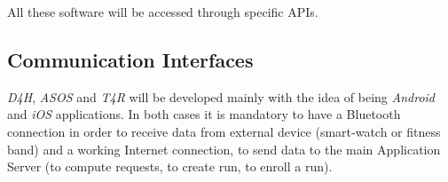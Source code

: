 All these software will be accessed through specific APIs.

\subsection{Communication Interfaces}
%
\emph{D4H}, \emph{ASOS} and \emph{T4R} will be developed mainly with the idea of being \emph{Android} and \emph{iOS} applications. In both cases it is mandatory to have a Bluetooth connection in order to receive data from external device (smart-watch or fitness band) and a working Internet connection,  to send data  to the main Application Server (to compute requests, to create run, to enroll a run).